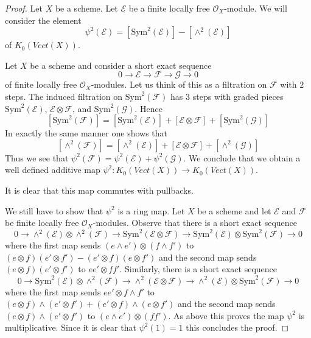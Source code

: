 \begin{proof}
Let $X$ be a scheme.
Let $\mathcal{E}$ be a finite locally free $\mathcal{O}_X$-module.
We will consider the element
$$
\psi^2(\mathcal{E}) = [\text{Sym}^2(\mathcal{E})] - [\wedge^2(\mathcal{E})]
$$
of $K_0(\textit{Vect}(X))$.

\medskip\noindent
Let $X$ be a scheme and consider a short exact sequence
$$
0 \to \mathcal{E} \to \mathcal{F} \to \mathcal{G} \to 0
$$
of finite locally free $\mathcal{O}_X$-modules. Let us think of
this as a filtration on $\mathcal{F}$ with $2$ steps. The induced
filtration on $\text{Sym}^2(\mathcal{F})$ has $3$ steps with
graded pieces $\text{Sym}^2(\mathcal{E})$, $\mathcal{E} \otimes \mathcal{F}$,
and $\text{Sym}^2(\mathcal{G})$. Hence
$$
[\text{Sym}^2(\mathcal{F})] =
[\text{Sym}^2(\mathcal{E})] +
[\mathcal{E} \otimes \mathcal{F}] +
[\text{Sym}^2(\mathcal{G})]
$$
In exactly the same manner one shows that
$$
[\wedge^2(\mathcal{F})] =
[\wedge^2(\mathcal{E})] +
[\mathcal{E} \otimes \mathcal{F}] +
[\wedge^2(\mathcal{G})]
$$
Thus we see that
$\psi^2(\mathcal{F}) = \psi^2(\mathcal{E}) + \psi^2(\mathcal{G})$.
We conclude that we obtain a well defined additive map
$\psi^2 : K_0(\textit{Vect}(X)) \to K_0(\textit{Vect}(X))$.

\medskip\noindent
It is clear that this map commutes with pullbacks.

\medskip\noindent
We still have to show that $\psi^2$ is a ring map.
Let $X$ be a scheme and let $\mathcal{E}$ and $\mathcal{F}$
be finite locally free $\mathcal{O}_X$-modules.
Observe that there is a short exact sequence
$$
0 \to \wedge^2(\mathcal{E}) \otimes \wedge^2(\mathcal{F}) \to
\text{Sym}^2(\mathcal{E} \otimes \mathcal{F}) \to
\text{Sym}^2(\mathcal{E}) \otimes \text{Sym}^2(\mathcal{F}) \to 0
$$
where the first map sends $(e \wedge e') \otimes (f \wedge f')$ to
$(e \otimes f)(e' \otimes f') - (e' \otimes f)(e \otimes f')$ and
the second map sends $(e \otimes f) (e' \otimes f')$ to $ee' \otimes ff'$.
Similarly, there is a short exact sequence
$$
0 \to \text{Sym}^2(\mathcal{E}) \otimes \wedge^2(\mathcal{F}) \to
\wedge^2(\mathcal{E} \otimes \mathcal{F}) \to
\wedge^2(\mathcal{E}) \otimes \text{Sym}^2(\mathcal{F}) \to 0
$$
where the first map sends $e e' \otimes f \wedge f'$ to
$(e \otimes f) \wedge (e' \otimes f') + (e' \otimes f) \wedge (e \otimes f')$
and the second map sends
$(e \otimes f) \wedge (e' \otimes f')$ to
$(e \wedge e') \otimes (f f')$.
As above this proves the map $\psi^2$ is multiplicative.
Since it is clear that $\psi^2(1) = 1$ this concludes the proof.
\end{proof}

